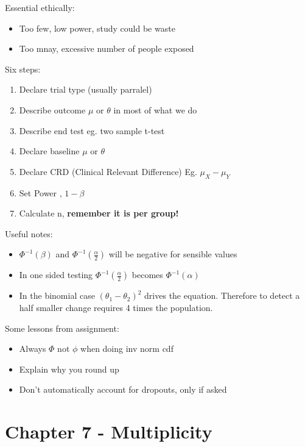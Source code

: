 \documentclass[
  letterpaper,
  DIV=11,
  numbers=noendperiod]{scrreprt}
\providecommand{\tightlist}{%
  \setlength{\itemsep}{0pt}\setlength{\parskip}{0pt}}\usepackage{longtable,booktabs,array}
\begin{document}
Essential ethically:

\begin{itemize}
\tightlist
\item
  Too few, low power, study could be waste
\item
  Too mnay, excessive number of people exposed
\end{itemize}

Six steps:

\begin{enumerate}
\def\labelenumi{\arabic{enumi})}
\tightlist
\item
  Declare trial type (usually parralel)
\item
  Describe outcome \(\mu\) or \(\theta\) in most of what we do
\item
  Describe end test eg. two sample t-test
\item
  Declare baseline \(\mu\) or \(\theta\)
\item
  Declare CRD (Clinical Relevant Difference) Eg. \(\mu_X - \mu_Y\)
\item
  Set Power , \(1- \beta\)
\item
  Calculate n, \textbf{remember it is per group!}
\end{enumerate}

Useful notes:

\begin{itemize}
\tightlist
\item
  \(\Phi^{-1}(\beta)\) and \(\Phi^{-1}(\frac{\alpha}{2})\) will be
  negative for sensible values
\item
  In one sided testing \(\Phi^{-1}(\frac{\alpha}{2})\) becomes
  \(\Phi^{-1}(\alpha)\)
\item
  In the binomial case \((\theta_1 - \theta_2)^2\) drives the equation.
  Therefore to detect a half smaller change requires 4 times the
  population.
\end{itemize}

Some lessons from assignment:

\begin{itemize}
\tightlist
\item
  Always \(\Phi\) not \(\phi\) when doing inv norm cdf
\item
  Explain why you round up
\item
  Don't automatically account for dropouts, only if asked
\end{itemize}

\hypertarget{chapter-7---multiplicity}{%
\section{Chapter 7 - Multiplicity}\label{chapter-7---multiplicity}}
\end{document}
